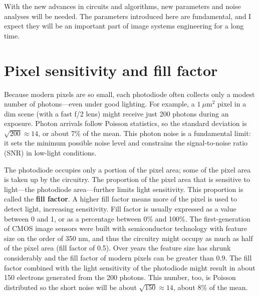 \documentclass[
  letterpaper,
]{book}
\begin{document}
With the new advances in circuits and algorithms, new parameters and
noise analyses will be needed. The parameters introduced here are
fundamental, and I expect they will be an important part of image
systems engineering for a long time.

\section{Pixel sensitivity and fill
factor}\label{sec-pixel-sensitivity-fillfactor}

Because modern pixels are so small, each photodiode often collects only
a modest number of photons---even under good lighting. For example, a
\(1~\mu\text{m}^2\) pixel in a dim scene (with a fast f/2 lens) might
receive just 200 photons during an exposure. Photon arrivals follow
Poisson statistics, so the standard deviation is
\(\sqrt{200} \approx 14\), or about 7\% of the mean. This photon noise
is a fundamental limit: it sets the minimum possible noise level and
constrains the signal-to-noise ratio (SNR) in low-light conditions.

The photodiode occupies only a portion of the pixel area; some of the
pixel area is taken up by the circuitry. The proportion of the pixel
area that is sensitive to light---the photodiode area---further limits
light sensitivity. This proportion is called the \textbf{fill factor}. A
higher fill factor means more of the pixel is used to detect light,
increasing sensitivity. Fill factor is usually expressed as a value
between 0 and 1, or as a percentage between 0\% and 100\%. The
first-generation of CMOS image sensors were built with semiconductor
technology with feature size on the order of 350 nm, and thus the
circuitry might occupy as much as half of the pixel area (fill factor of
0.5). Over years the feature size has shrunk considerably and the fill
factor of modern pixels can be greater than 0.9. The fill factor
combined with the light sensitivity of the photodiode might result in
about 150 electrons generated from the 200 photons. This number, too, is
Poisson distributed so the short noise will be about
\(\sqrt{150} \approx 14\), about 8\% of the mean.
\end{document}
